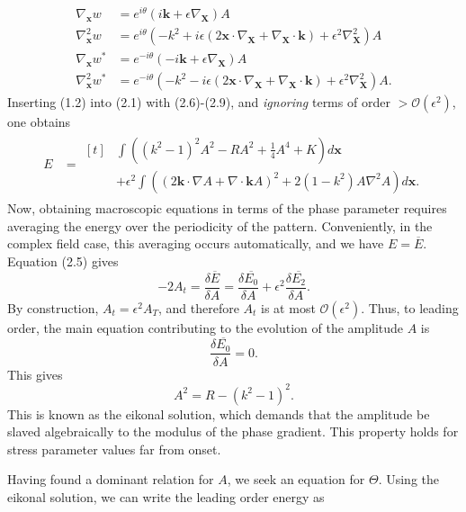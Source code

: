 \documentclass[12pt]{article}
\numberwithin{equation}{section}
\begin{document}
\begin{align}
\nabla_{\bm{x}}w &= e^{i\theta}(i\bm{k}+\epsilon\nabla_{\bm{X}})A\\
\nabla^2_{\bm{x}}w &= e^{i\theta}(-k^2+i\epsilon(2\bm{x}\cdot \nabla_{\bm{X}}+\nabla_{\bm{X}}\cdot\bm{k})+\epsilon^2\nabla^2_{\bm{X}})A\\
\nabla_{\bm{x}}w^* &= e^{-i\theta}(-i\bm{k}+\epsilon\nabla_{\bm{X}})A\\
\nabla^2_{\bm{x}}w^* &= e^{-i\theta}(-k^2-i\epsilon(2\bm{x}\cdot \nabla_{\bm{X}}+\nabla_{\bm{X}}\cdot\bm{k})+\epsilon^2\nabla^2_{\bm{X}})A.
\end{align}
Inserting (1.2) into (2.1) with (2.6)-(2.9), and \emph{ignoring} terms of order $> \mathcal{O}(\epsilon^2)$, one obtains
\begin{align}
E &= \begin{aligned}[t]
     &\int \left( (k^2-1)^2A^2 - RA^2 + \frac{1}{4}A^4 + K\right)d\bm{x}\\
     & + \epsilon^2 \int \left( (2\bm{k}\cdot \nabla A + \nabla \cdot \bm{k}A)^2 + 2(1-k^2)A\nabla^2A \right)d\bm{x}.
     \end{aligned}
\end{align}
Now, obtaining macroscopic equations in terms of the phase parameter requires averaging the energy over the periodicity of the pattern. Conveniently, in the complex field case, this averaging occurs automatically, and we have $E = \overline{E}$. Equation (2.5) gives
\begin{equation}
-2A_t = \frac{\delta \overline{E}}{\delta A} = \frac{\delta\overline{E_0}}{\delta A}+\epsilon^2 \frac{\delta \overline{E_2}}{\delta A}.
\end{equation}
By construction, $A_t = \epsilon^2 A_T$, and therefore $A_t$ is at most $\mathcal{O}(\epsilon^2)$. Thus, to leading order, the main equation contributing to the evolution of the amplitude $A$ is
\begin{equation}
\frac{\delta \overline{E_0}}{\delta A} = 0.
\end{equation}
This gives
\begin{equation}
A^2 = R - (k^2-1)^2.
\end{equation}
This is known as the eikonal solution, which demands that the amplitude be slaved algebraically to the modulus of the phase gradient. This property holds for stress parameter values far from onset.
\par Having found a dominant relation for $A$, we seek an equation for $\Theta$. Using the eikonal solution, we can write the leading order energy as
\end{document}
